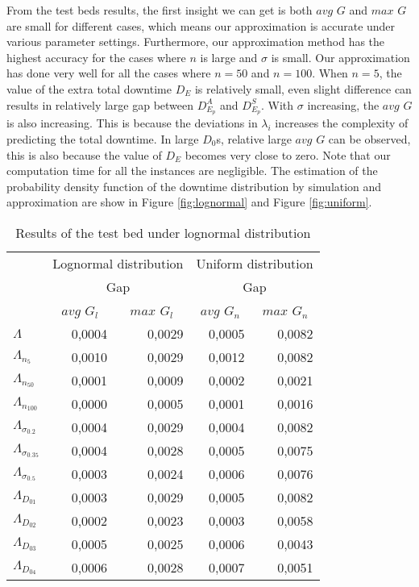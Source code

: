 \documentclass[preprint,12pt]{elsarticle}
\begin{document}
From the test beds results, the first insight we can get is both $avg$ $G$ and $max$ $G$ are small for different cases, which means our approximation is accurate under various parameter settings. Furthermore, our approximation method has the highest accuracy for the cases where $n$ is large and $\sigma$ is small. Our approximation has done very well for all the cases where $n=50$ and $n=100$. When $n=5$, the value of the extra total downtime $D_{E}$ is relatively small, even slight difference can results in relatively large gap between $D_{E_{p}}^{A}$ and $D_{E_{p}}^{S}$. With $\sigma$ increasing, the $avg$ $G$ is also increasing. This is because the deviations in $\lambda_{i}$ increases the complexity of predicting the total downtime. In large $D_{0}$s, relative large $avg$ $G$ can be observed, this is also because the value of $D_{E}$ becomes very close to zero. Note that our computation time for all the instances are negligible. The estimation of the probability density function of the downtime distribution by simulation and approximation are show in Figure \ref{fig:lognormal} and Figure \ref{fig:uniform}.

\begin{table}[htbp]
  \centering
  \caption{Results of the test bed under lognormal distribution}
    \begin{tabular}{lrrrr}
    \toprule
          & \multicolumn{2}{c}{Lognormal distribution} & \multicolumn{2}{c}{Uniform distribution} \\
          & \multicolumn{2}{c}{Gap} & \multicolumn{2}{c}{Gap} \\
          & \multicolumn{1}{c}{$avg$ $G_{l}$} & \multicolumn{1}{c}{$max$ $G_{l}$} & \multicolumn{1}{c}{$avg$ $G_{n}$} & \multicolumn{1}{c}{$max$ $G_{n}$} \\
    \midrule
     $\Lambda$  & 0,0004 & 0,0029 & 0,0005 & 0,0082 \\
     $\Lambda_{n_{5}}$ & 0,0010 & 0,0029 & 0,0012 & 0,0082 \\
    $\Lambda_{n_{50}}$ & 0,0001 & 0,0009 & 0,0002 & 0,0021 \\
    $\Lambda_{n_{100}}$ & 0,0000 & 0,0005 & 0,0001 & 0,0016 \\
    $\Lambda_{\sigma_{0.2}}$ & 0,0004 & 0,0029 & 0,0004 & 0,0082 \\
    $\Lambda_{\sigma_{0.35}}$ & 0,0004 & 0,0028 & 0,0005 & 0,0075 \\
   $\Lambda_{\sigma_{0.5}}$ & 0,0003 & 0,0024 & 0,0006 & 0,0076 \\
   $\Lambda_{D_{01}}$ & 0,0003 & 0,0029 & 0,0005 & 0,0082 \\
   $\Lambda_{D_{02}}$ & 0,0002 & 0,0023 & 0,0003 & 0,0058 \\
   $\Lambda_{D_{03}}$  & 0,0005 & 0,0025 & 0,0006 & 0,0043 \\
    $\Lambda_{D_{04}}$  & 0,0006 & 0,0028 & 0,0007 & 0,0051 \\
    \bottomrule
    \end{tabular}%
  \label{generalapptable}%
\end{table}%
\end{document}
